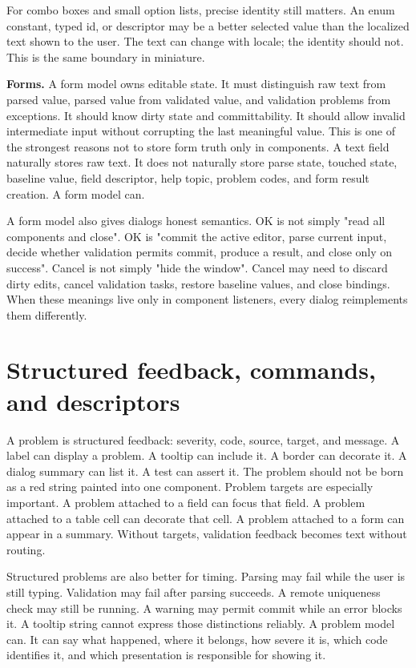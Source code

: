 For combo boxes and small option lists, precise identity still matters. An enum constant, typed id, or descriptor may be a better selected value than the localized text shown to the user. The text can change with locale; the identity should not. This is the same boundary in miniature.

\textbf{Forms.} A form model owns editable state. It must distinguish raw text from parsed value, parsed value from validated value, and validation problems from exceptions. It should know dirty state and committability. It should allow invalid intermediate input without corrupting the last meaningful value. This is one of the strongest reasons not to store form truth only in components. A text field naturally stores raw text. It does not naturally store parse state, touched state, baseline value, field descriptor, help topic, problem codes, and form result creation. A form model can.

A form model also gives dialogs honest semantics. OK is not simply "read all components and close". OK is "commit the active editor, parse current input, decide whether validation permits commit, produce a result, and close only on success". Cancel is not simply "hide the window". Cancel may need to discard dirty edits, cancel validation tasks, restore baseline values, and close bindings. When these meanings live only in component listeners, every dialog reimplements them differently.

\section{Structured feedback, commands, and descriptors}

A problem is structured feedback: severity, code, source, target, and message. A label can display a problem. A tooltip can include it. A border can decorate it. A dialog summary can list it. A test can assert it. The problem should not be born as a red string painted into one component. Problem targets are especially important. A problem attached to a field can focus that field. A problem attached to a table cell can decorate that cell. A problem attached to a form can appear in a summary. Without targets, validation feedback becomes text without routing.

Structured problems are also better for timing. Parsing may fail while the user is still typing. Validation may fail after parsing succeeds. A remote uniqueness check may still be running. A warning may permit commit while an error blocks it. A tooltip string cannot express those distinctions reliably. A problem model can. It can say what happened, where it belongs, how severe it is, which code identifies it, and which presentation is responsible for showing it.

